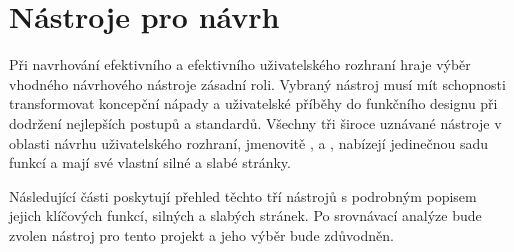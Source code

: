 \section{Nástroje pro návrh}
\label{sec:navrh-ui-nastroje}
Při navrhování efektivního a efektivního uživatelského rozhraní hraje výběr vhodného návrhového nástroje zásadní roli.
Vybraný nástroj musí mít schopnosti transformovat koncepční nápady a uživatelské příběhy do funkčního designu při dodržení nejlepších postupů a standardů.
Všechny tři široce uznávané nástroje v oblasti návrhu uživatelského rozhraní, jmenovitě ,  a , nabízejí jedinečnou sadu funkcí a mají své vlastní silné a slabé stránky\cite{w_how_to_20_best_ui_design_tools}.

Následující části poskytují přehled těchto tří nástrojů s podrobným popisem jejich klíčových funkcí, silných a slabých stránek.
Po srovnávací analýze bude zvolen nástroj pro tento projekt a jeho výběr bude zdůvodněn.
\pagebreak

